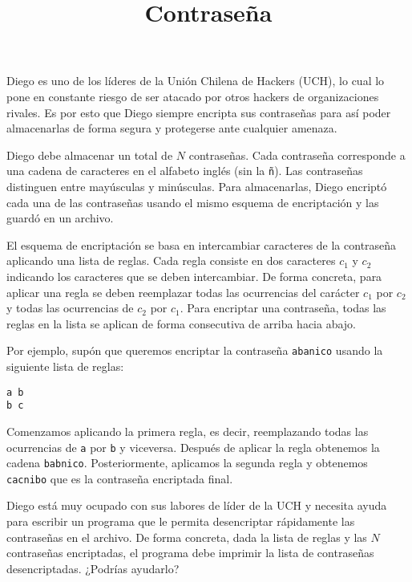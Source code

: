 \documentclass{oci}
\title{Contraseña}
\begin{document}
\begin{problemDescription}
  Diego es uno de los líderes de la Unión Chilena de Hackers (UCH), lo cual lo pone
  en constante riesgo de ser atacado por otros hackers de organizaciones rivales.
  Es por esto que Diego siempre encripta sus contraseñas para así poder almacenarlas de
  forma segura y protegerse ante cualquier amenaza.

  Diego debe almacenar un total de $N$ contraseñas.
  Cada contraseña corresponde a una cadena de caracteres en el alfabeto inglés
  (sin la \texttt{ñ}).
  Las contraseñas distinguen entre mayúsculas y minúsculas.
  Para almacenarlas, Diego encriptó cada una de las contraseñas usando el mismo
  esquema de encriptación y las guardó en un archivo.

  El esquema de encriptación se basa en intercambiar caracteres de la contraseña
  aplicando una lista de reglas.
  Cada regla consiste en dos caracteres $c_1$ y $c_2$ indicando los caracteres
  que se deben intercambiar.
  De forma concreta, para aplicar una regla se deben reemplazar todas las ocurrencias
  del carácter $c_1$ por $c_2$ y todas las ocurrencias de $c_2$ por $c_1$.
  Para encriptar una contraseña, todas las reglas en la lista se aplican de forma consecutiva
  de arriba hacia abajo.

  Por ejemplo, supón que queremos encriptar la contraseña \texttt{abanico} usando la siguiente
  lista de reglas:
\begin{center}
\texttt{a b} \\
\texttt{b c}
\end{center}
  Comenzamos aplicando la primera regla, es decir, reemplazando todas las ocurrencias de
  \texttt{a} por \texttt{b} y viceversa.
  Después de aplicar la regla obtenemos la cadena \texttt{babnico}.
  Posteriormente, aplicamos la segunda regla y obtenemos \texttt{cacnibo} que es la contraseña
  encriptada final.

  Diego está muy ocupado con sus labores de líder de la UCH y necesita ayuda para escribir un
  programa que le permita desencriptar rápidamente las contraseñas en el archivo.
  De forma concreta, dada la lista de reglas y las $N$ contraseñas encriptadas, el programa
  debe imprimir la lista de contraseñas desencriptadas.
  ¿Podrías ayudarlo?
\end{problemDescription}
\end{document}
